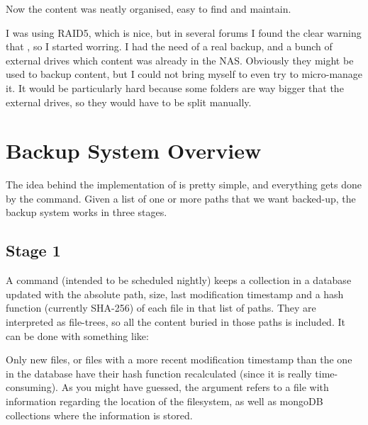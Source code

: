 \documentclass[letterpaper,10pt,english]{sphinxmanual}
\begin{document}
Now the content was neatly organised, easy to find and maintain.

I was using RAID5, which is nice, but in several forums I found the clear warning
that , so I started worring.
I had the need of a real backup, and a bunch of external drives which content was already in the NAS.
Obviously they might be used to backup content, but I could not bring myself to even try to micro-manage it.
It would be particularly hard because some folders are way bigger that the external drives, so they would have to be split manually.


\section{Backup System Overview}
\label{\detokenize{index:backup-system-overview}}
The idea behind the implementation of  is pretty simple, and everything gets done by the  command.
Given a list of one or more paths that we want backed-up, the backup system works in three stages.


\subsection{Stage 1}
\label{\detokenize{index:stage-1}}
A command (intended to be scheduled nightly) keeps a collection in a  database updated with
the absolute path, size, last modification timestamp and a hash function (currently SHA-256) of each file in that list of paths.
They are interpreted as file-trees, so all the content buried in those paths is included.
It can be done with something like:

\begin{sphinxVerbatim}[commandchars=\\\{\}]
  
\end{sphinxVerbatim}

Only new files, or files with a more recent modification timestamp than the one in the database have their hash function recalculated
(since it is really time-consuming). As you might have guessed, the  argument refers
to a  file with information regarding the location
of the filesystem, as well as mongoDB collections where the information is stored.
\end{document}
